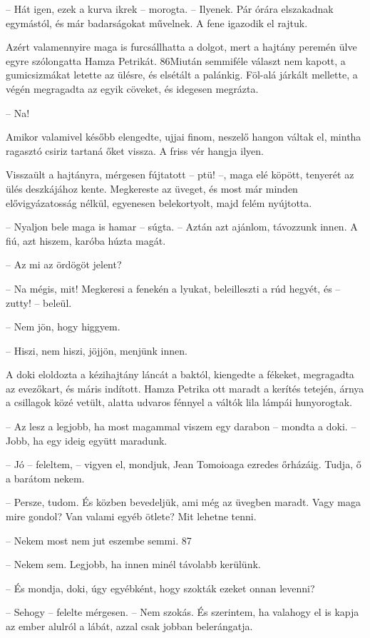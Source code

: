 \documentclass{IEEEtran}
\begin{document}
– Hát igen, ezek a kurva ikrek – morogta. – Ilyenek. Pár órára elszakadnak
egymástól, és már badarságokat művelnek. A fene igazodik el rajtuk.

Azért valamennyire maga is furcsállhatta a dolgot, mert a hajtány peremén ülve
egyre szólongatta Hamza Petrikát. 86Miután semmiféle választ nem kapott, a
gumicsizmákat letette az ülésre, és elsétált a palánkig. Föl-alá járkált
mellette, a végén megragadta az egyik cöveket, és idegesen megrázta.

– Na!

Amikor valamivel később elengedte, ujjai finom, neszelő hangon váltak el,
mintha ragasztó csiriz tartaná őket vissza. A friss vér hangja ilyen.

Visszaült a hajtányra, mérgesen fújtatott – ptü! –, maga elé köpött, tenyerét
az ülés deszkájához kente. Megkereste az üveget, és most már minden
elővigyázatosság nélkül, egyenesen belekortyolt, majd felém nyújtotta.

– Nyaljon bele maga is hamar – súgta. – Aztán azt ajánlom, távozzunk innen. A
fiú, azt hiszem, karóba húzta magát.

– Az mi az ördögöt jelent?

– Na mégis, mit! Megkeresi a fenekén a lyukat, beleilleszti a rúd hegyét, és –
zutty! – beleül.

– Nem jön, hogy higgyem.

– Hiszi, nem hiszi, jöjjön, menjünk innen.

A doki eloldozta a kézihajtány láncát a baktól, kiengedte a fékeket,
megragadta az evezőkart, és máris indított. Hamza Petrika ott maradt a kerítés
tetején, árnya a csillagok közé vetült, alatta udvaros fénnyel a váltók lila
lámpái hunyorogtak.

– Az lesz a legjobb, ha most magammal viszem egy darabon – mondta a doki. –
Jobb, ha egy ideig együtt maradunk.

– Jó – feleltem, – vigyen el, mondjuk, Jean Tomoioaga ezredes őrházáig. Tudja,
ő a barátom nekem.

– Persze, tudom. És közben bevedeljük, ami még az üvegben maradt. Vagy maga
mire gondol? Van valami egyéb ötlete? Mit lehetne tenni.

– Nekem most nem jut eszembe semmi.
87

– Nekem sem. Legjobb, ha innen minél távolabb kerülünk.

– És mondja, doki, úgy egyébként, hogy szokták ezeket onnan levenni?

– Sehogy – felelte mérgesen. – Nem szokás. És szerintem, ha valahogy el is
kapja az ember alulról a lábát, azzal csak jobban belerángatja.
\end{document}
